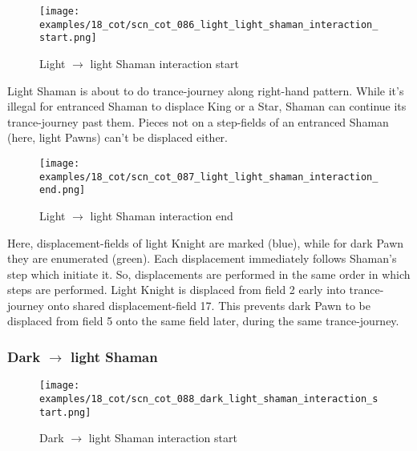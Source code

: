\vspace*{-1.2\baselineskip}
\noindent
\begin{figure}[!h]
\texttt{[image: examples/18\_cot/scn\_cot\_086\_light\_light\_shaman\_interaction\_start.png]}
\caption{Light $\rightarrow$ light Shaman interaction start}
\label{fig:scn_cot_086_light_light_shaman_interaction_start}
\end{figure}

Light Shaman is about to do trance-journey along right-hand pattern. While it's
illegal for entranced Shaman to displace King or a Star, Shaman can continue its
trance-journey past them. Pieces not on a step-fields of an entranced Shaman (here,
light Pawns) can't be displaced either.

\clearpage %

\noindent
\begin{figure}[!h]
\texttt{[image: examples/18\_cot/scn\_cot\_087\_light\_light\_shaman\_interaction\_end.png]}
\caption{Light $\rightarrow$ light Shaman interaction end}
\label{fig:scn_cot_087_light_light_shaman_interaction_end}
\end{figure}

Here, displacement-fields of light Knight are marked (blue), while for dark Pawn
they are enumerated (green). Each displacement immediately follows Shaman's step
which initiate it. So, displacements are performed in the same order in which steps
are performed. Light Knight is displaced from field 2 early into trance-journey
onto shared displacement-field 17. This prevents dark Pawn to be displaced from
field 5 onto the same field later, during the same trance-journey.

\clearpage %

\subsubsection*{Dark $\rightarrow$ light Shaman}
\label{sec:Conquest of Tlalocan/Trance-journey/Interactions/Dark --> light Shaman}

\vspace*{-1.4\baselineskip}
\noindent
\begin{figure}[!h]
\texttt{[image: examples/18\_cot/scn\_cot\_088\_dark\_light\_shaman\_interaction\_start.png]}
\caption{Dark $\rightarrow$ light Shaman interaction start}
\label{fig:scn_cot_088_dark_light_shaman_interaction_start}
\end{figure}

